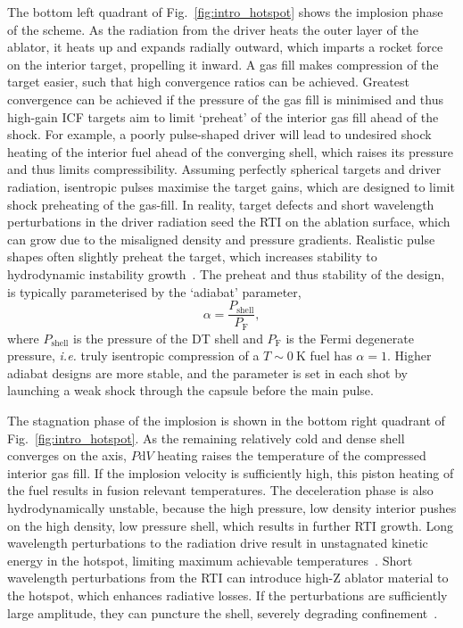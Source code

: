 The bottom left quadrant of Fig.~\ref{fig:intro_hotspot} shows the implosion phase of the scheme.
As the radiation from the driver heats the outer layer of the ablator, it heats up and expands radially outward, which imparts a rocket force on the interior target, propelling it inward.
A gas fill makes compression of the target easier, such that high convergence ratios can be achieved.
Greatest convergence can be achieved if the pressure of the gas fill is minimised and thus high-gain \ac{ICF} targets aim to limit `preheat' of the interior gas fill ahead of the shock.
For example, a poorly pulse-shaped driver will lead to undesired shock heating of the interior fuel ahead of the converging shell, which raises its pressure and thus limits compressibility.
Assuming perfectly spherical targets and driver radiation, isentropic pulses maximise the target gains, which are designed to limit shock preheating of the gas-fill.
In reality, target defects and short wavelength perturbations in the driver radiation seed the \ac{RTI} on the ablation surface, which can grow due to the misaligned density and pressure gradients.
Realistic pulse shapes often slightly preheat the target, which increases stability to hydrodynamic instability growth~\cite{goncharov_improved_2003,hurricane_highfoot_2014}.
The preheat and thus stability of the design, is typically parameterised by the `adiabat' parameter,
\begin{equation}
    \label{eq:intro_adiabat}
    \alpha = \frac{P_{\text{shell}}}{P_{\text{F}}},
\end{equation}
where $P_{\text{shell}}$ is the pressure of the DT shell and $P_{\text{F}}$ is the Fermi degenerate pressure, \textit{i.e.} truly isentropic compression of a $T\sim0\ \text{K}$ fuel has $\alpha=1$.
Higher adiabat designs are more stable, and the parameter is set in each shot by launching a weak shock through the capsule before the main pulse.

The stagnation phase of the implosion is shown in the bottom right quadrant of Fig.~\ref{fig:intro_hotspot}.
As the remaining relatively cold and dense shell converges on the axis, $P\text{d}V$ heating raises the temperature of the compressed interior gas fill.
If the implosion velocity is sufficiently high, this piston heating of the fuel results in fusion relevant temperatures.
The deceleration phase is also hydrodynamically unstable, because the high pressure, low density interior pushes on the high density, low pressure shell, which results in further \ac{RTI} growth.
Long wavelength perturbations to the radiation drive result in unstagnated kinetic energy in the hotspot, limiting maximum achievable temperatures~\cite{gatujohnson_impact_2018}.
Short wavelength perturbations from the \ac{RTI} can introduce high-Z ablator material to the hotspot, which enhances radiative losses.
If the perturbations are sufficiently large amplitude, they can puncture the shell, severely degrading confinement~\cite{smalyuk_review_2020}.

